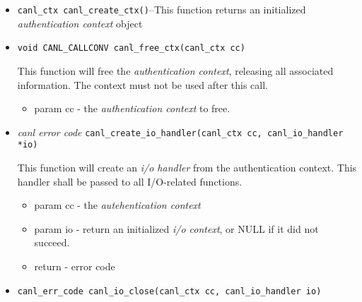 \begin{itemize}
  \item \verb'canl_ctx canl_create_ctx()'--This function
  returns an initialized \textit{authentication context} object
  \item \verb'void CANL_CALLCONV canl_free_ctx(canl_ctx cc)'

  This function will free the \textit{authentication context}, releasing 
  all associated information.  The context must not be used after this call.
  \begin{itemize}
    \item param cc - the \textit{authentication context} to free.
  \end{itemize}
  \item \textit{canl error code}
  \verb'canl_create_io_handler(canl_ctx cc, canl_io_handler *io)'

  This function will create an \textit{i/o handler} from the authentication 
  context. This handler shall be passed to all I/O-related functions.
  \begin{itemize}
    \item param cc - the \textit{autehentication context}
    \item param io -  return an initialized \textit{i/o context}, 
or NULL if it did not succeed.
    \item return - \CANL error code
  \end{itemize}

  \item \verb'canl_err_code canl_io_close(canl_ctx cc, canl_io_handler io)'


\end{itemize}
